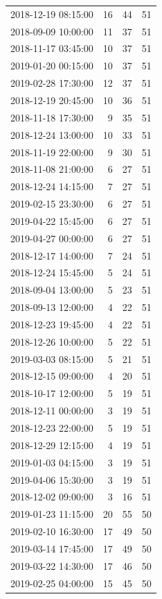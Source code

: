 \begin{tabular}{lrrr}
2018-12-19 08:15:00 & 16 & 44 & 51 \\
2018-09-09 10:00:00 & 11 & 37 & 51 \\
2018-11-17 03:45:00 & 10 & 37 & 51 \\
2019-01-20 00:15:00 & 10 & 37 & 51 \\
2019-02-28 17:30:00 & 12 & 37 & 51 \\
2018-12-19 20:45:00 & 10 & 36 & 51 \\
2018-11-18 17:30:00 & 9 & 35 & 51 \\
2018-12-24 13:00:00 & 10 & 33 & 51 \\
2018-11-19 22:00:00 & 9 & 30 & 51 \\
2018-11-08 21:00:00 & 6 & 27 & 51 \\
2018-12-24 14:15:00 & 7 & 27 & 51 \\
2019-02-15 23:30:00 & 6 & 27 & 51 \\
2019-04-22 15:45:00 & 6 & 27 & 51 \\
2019-04-27 00:00:00 & 6 & 27 & 51 \\
2018-12-17 14:00:00 & 7 & 24 & 51 \\
2018-12-24 15:45:00 & 5 & 24 & 51 \\
2018-09-04 13:00:00 & 5 & 23 & 51 \\
2018-09-13 12:00:00 & 4 & 22 & 51 \\
2018-12-23 19:45:00 & 4 & 22 & 51 \\
2018-12-26 10:00:00 & 5 & 22 & 51 \\
2019-03-03 08:15:00 & 5 & 21 & 51 \\
2018-12-15 09:00:00 & 4 & 20 & 51 \\
2018-10-17 12:00:00 & 5 & 19 & 51 \\
2018-12-11 00:00:00 & 3 & 19 & 51 \\
2018-12-23 22:00:00 & 5 & 19 & 51 \\
2018-12-29 12:15:00 & 4 & 19 & 51 \\
2019-01-03 04:15:00 & 3 & 19 & 51 \\
2019-04-06 15:30:00 & 3 & 19 & 51 \\
2018-12-02 09:00:00 & 3 & 16 & 51 \\
2019-01-23 11:15:00 & 20 & 55 & 50 \\
2019-02-10 16:30:00 & 17 & 49 & 50 \\
2019-03-14 17:45:00 & 17 & 49 & 50 \\
2019-03-22 14:30:00 & 17 & 46 & 50 \\
2019-02-25 04:00:00 & 15 & 45 & 50 \\

\end{tabular}
